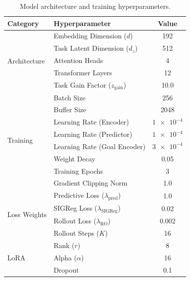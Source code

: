 \begin{table}[htbp]
	\centering
	\caption{Model architecture and training hyperparameters.}
	\label{tab:hyperparameters}
	\begin{tabular}{llc}
		\toprule
		\textbf{Category} & \textbf{Hyperparameter}                   & \textbf{Value} \\
		\midrule
		\multirow{5}{*}{Architecture}
		                  & Embedding Dimension ($d$)                 & 192            \\
		                  & Task Latent Dimension ($d_z$)             & 512            \\
		                  & Attention Heads                           & 4              \\
		                  & Transformer Layers                        & 12             \\
		                  & Task Gain Factor ($z_{\text{gain}}$)      & 10.0           \\
		\midrule
		\multirow{8}{*}{Training}
		                  & Batch Size                                & 256            \\
		                  & Buffer Size                               & 2048           \\
		                  & Learning Rate (Encoder)                   & $\num{1e-4}$   \\
		                  & Learning Rate (Predictor)                 & $\num{1e-4}$   \\
		                  & Learning Rate (Goal Encoder)              & $\num{3e-4}$   \\
		                  & Weight Decay                              & 0.05           \\
		                  & Training Epochs                           & 3              \\
		                  & Gradient Clipping Norm                    & 1.0            \\
		\midrule
		\multirow{4}{*}{Loss Weights}
		                  & Predictive Loss ($\lambda_{\text{pred}}$) & 1.0            \\
		                  & SIGReg Loss ($\lambda_{\text{SIGReg}}$)   & 0.02           \\
		                  & Rollout Loss ($\lambda_{\text{RO}}$)      & 0.002          \\
		                  & Rollout Steps ($K$)                       & 16             \\
		\midrule
		\multirow{3}{*}{LoRA}
		                  & Rank ($r$)                                & 8              \\
		                  & Alpha ($\alpha$)                          & 16             \\
		                  & Dropout                                   & 0.1            \\
		\bottomrule
	\end{tabular}
\end{table}

